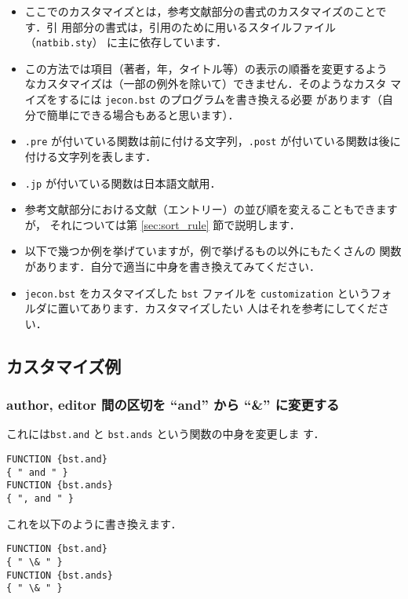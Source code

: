 \documentclass[article]{jlreq}
\begin{document}
\begin{itemize}
 \item ここでのカスタマイズとは，参考文献部分の書式のカスタマイズのことです．引
       用部分の書式は，引用のために用いるスタイルファイル（\texttt{natbib.sty}）
       に主に依存しています．
 \item この方法では項目（著者，年，タイトル等）の表示の順番を変更するよう
       なカスタマイズは（一部の例外を除いて）できません．そのようなカスタ
       マイズをするには \texttt{jecon.bst} のプログラムを書き換える必要
       があります（自分で簡単にできる場合もあると思います）．
 \item \texttt{.pre} が付いている関数は前に付ける文字列，\texttt{.post} 
       が付いている関数は後に付ける文字列を表します．
 \item \texttt{.jp} が付いている関数は日本語文献用．
 \item 参考文献部分における文献（エントリー）の並び順を変えることもできますが，
       それについては第 \ref{sec:sort_rule} 節で説明します．
 \item 以下で幾つか例を挙げていますが，例で挙げるもの以外にもたくさんの
       関数があります．自分で適当に中身を書き換えてみてください．
 \item \texttt{jecon.bst} をカスタマイズした \texttt{bst} ファイルを
       \texttt{customization} というフォルダに置いてあります．カスタマイズしたい
       人はそれを参考にしてください．
\end{itemize}

\subsection{カスタマイズ例}

\subsubsection{author, editor 間の区切を ``and'' から ``\&'' に変更する}

これには\texttt{bst.and} と \texttt{bst.ands} という関数の中身を変更しま
す．
\begin{screen}
\begin{verbatim}
FUNCTION {bst.and}
{ " and " }
FUNCTION {bst.ands}
{ ", and " }
\end{verbatim}
\end{screen}

これを以下のように書き換えます．
\begin{screen}
\begin{verbatim}
FUNCTION {bst.and}
{ " \& " }
FUNCTION {bst.ands}
{ " \& " }
\end{verbatim}
\end{screen}
\end{document}
